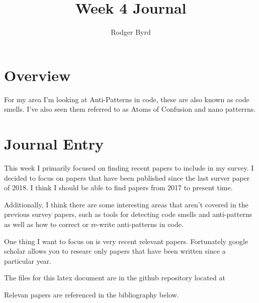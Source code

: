\documentclass[conference]{IEEEtran}
\begin{document}

\title{Week 4 Journal}
\author{Rodger Byrd}
\maketitle


\section{Overview}
For my area I'm looking at Anti-Patterns in code, these are also known as code smells. I've also seen them referred to as Atoms of Confusion and nano patterrns.

\section{Journal Entry}
This week I primarily focused on finding recent papers to include in my survey.
I decided to focus on papers that have been published since the last surver paper of 2018.
I think I should be able to find papers from 2017 to present time.

Additionally, I think there are some interesting areas that aren't covered in the previous survey papers, such as tools for detecting code smells and anti-patterns as well as how to correct or re-write anti-patterns in code.

One thing I want to focus on is very recent relevant papers.
Fortunately google scholar allows you to researc only papers that have been written since a particular year.

The files for this latex document are in the github repository located at 

Relevan papers are referenced in the bibliography below. 
\nocite{*}
\clearpage




\end{document}
